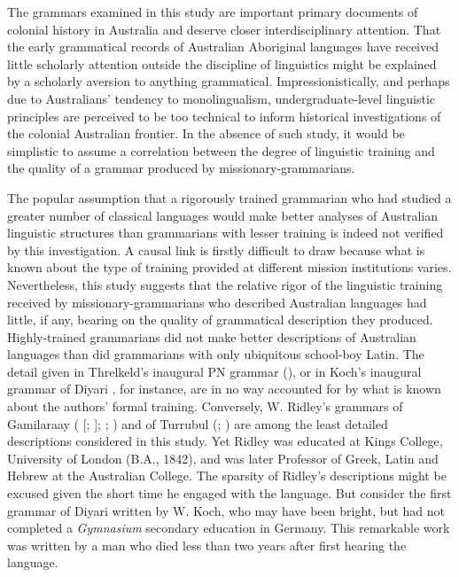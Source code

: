 The grammars examined in this study are important primary documents of colonial history in Australia and deserve closer interdisciplinary attention. That the early grammatical records of Australian Aboriginal languages have received little scholarly attention outside the discipline of linguistics might be explained by a scholarly aversion to anything grammatical. Impressionistically, and perhaps due to Australians' tendency to monolingualism, undergraduate-level linguistic principles are perceived to be too technical to inform historical investigations of the colonial Australian frontier. In the absence of such study, it would be simplistic to assume a correlation between the degree of linguistic training and the quality of a grammar produced by missionary-grammarians.

The popular assumption that a rigorously trained grammarian who had studied a greater number of classical languages would make better analyses of Australian linguistic structures than grammarians with lesser training is indeed not verified by this investigation. A causal link is firstly difficult to draw because what is known about the type of training provided at different mission institutions varies. Nevertheless, this study suggests that the relative rigor of the linguistic training received by missionary-grammarians who described Australian languages had little, if any, bearing on the quality of grammatical description they produced. Highly-trained grammarians did not make better descriptions of Australian languages than did grammarians with only ubiquitous school-boy Latin. The detail given in Threlkeld’s inaugural PN grammar (\citeyear{threlkeld_australian_1834}), or in Koch’s inaugural grammar of Diyari \citep{koch_untitled_1868}, for instance, are in no way accounted for by what is known about the authors' formal training. Conversely, W. Ridley’s grammars of Gamilaraay (\citeyear{ridley_kamilaroi_1875} [\citeyear{ridley_kamilaroi_1866}; \citeyear{ridley_gurre_1856}]; \citeyear{ridley_kamilaroi_1855}; \citeyear{ridley_kamilaroi_1856}) and of Turrubul (\citeyear{ridley_kamilaroi_1866}; ) are among the least detailed descriptions considered in this study. Yet Ridley was educated at Kings College, University of London (B.A., 1842), and was later Professor of Greek, Latin and Hebrew at the Australian College. The sparsity of Ridley’s descriptions might be excused given the short time he engaged with the language. But consider the first grammar of Diyari \citep{koch_untitled_1868} written by W. Koch, who may have been bright, but had not completed a \textit{Gymnasium} secondary education in Germany. This remarkable work was written by a man who died less than two years after first hearing the language.


